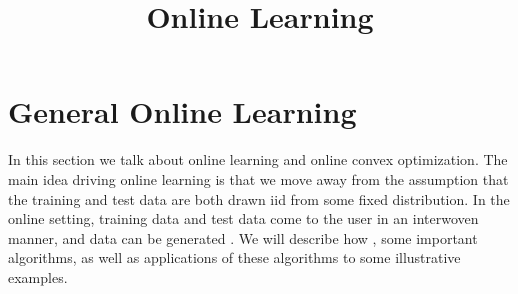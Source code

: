 \documentclass{article}
\title{Online Learning}
\begin{document}
\maketitle

\section{General Online Learning}
In this section we  talk about online learning and online convex optimization. The main idea driving online learning is that we move away from the assumption that the training and test data are both drawn \gls{iid} from some fixed distribution. In the online setting, training data and test data come to the user in an interwoven manner, and data can be generated . We will describe how , some important algorithms, as well as applications of these algorithms to some illustrative examples.
\end{document}
